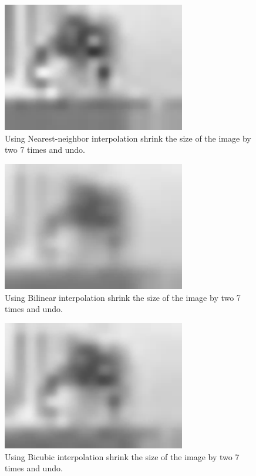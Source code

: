 \documentclass[conference]{IEEEtran}
\begin{document}
\begin{figure}[H]
\centerline{\includegraphics[width=8cm]{grayCat1_7.jpg}}
\caption{Using Nearest-neighbor interpolation shrink the size of the image by two 7 times and undo.}
\label{fig}
\end{figure}
\begin{figure}[H]
\centerline{\includegraphics[width=8cm]{grayCat2_7.jpg}}
\caption{Using Bilinear interpolation shrink the size of the image by two 7 times and undo.}
\label{fig}
\end{figure}
\begin{figure}[H]
\centerline{\includegraphics[width=8cm]{grayCat3_7.jpg}}
\caption{Using Bicubic interpolation shrink the size of the image by two 7 times and undo.}
\label{fig}
\end{figure}



\vspace{12pt}
\end{document}
